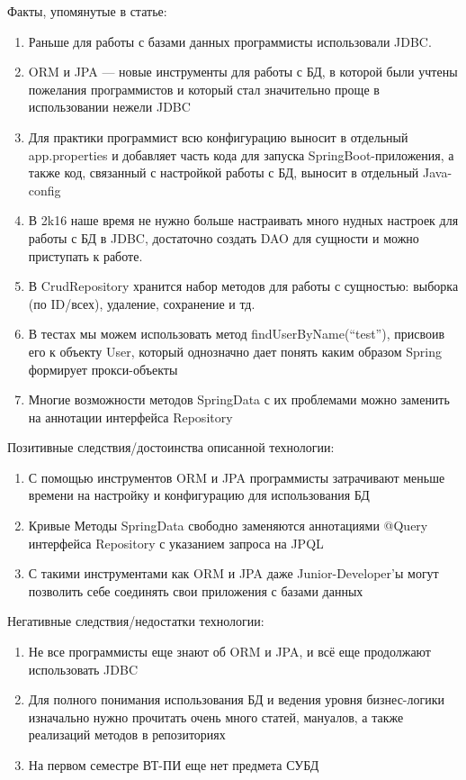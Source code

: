 \documentclass[12pt]{article}
\begin{document}
	{
	\newline
	Факты, упомянутые в статье:
	{\normalsize
	\par
	
	\begin{enumerate}
	\setlength\itemsep{0em}
	\item  Раньше для работы с базами данных программисты использовали JDBC. 
	\item  ORM и JPA — новые инструменты для работы с БД, в которой были учтены пожелания программистов и который стал значительно проще в использовании нежели JDBC
	\item Для практики программист всю конфигурацию выносит в отдельный app.properties и добавляет часть кода для запуска SpringBoot-приложения, а также код, связанный с настройкой работы с БД, выносит в отдельный Java-config 
	\item В 2k16 наше время не нужно больше настраивать много нудных настроек для работы с БД в JDBC, достаточно создать DAO для сущности и можно приступать к работе. 
	\item В CrudRepository хранится набор методов для работы с сущностью: выборка (по ID/всех), удаление, сохранение и тд.
	\item В тестах мы можем использовать метод findUserByName(“test”), присвоив его к объекту User, который однозначно дает понять каким образом Spring формирует прокси-объекты 
	\item Многие возможности методов SpringData с их проблемами можно заменить на аннотации интерфейса Repository 
	\end{enumerate}}
	\hrulefill
	\vspace{0.15in}
	\newline
	Позитивные следствия/достоинства описанной технологии:
	{\normalsize
	\par
	\begin{enumerate}
	\setlength\itemsep{0em}
	\item С помощью инструментов ORM и JPA программисты затрачивают меньше времени на настройку и конфигурацию для использования БД 
	\item Кривые Методы SpringData свободно заменяются аннотациями @Query интерфейса Repository с указанием запроса на JPQL
	\item С такими инструментами как ORM и JPA даже Junior-Developer’ы могут позволить себе соединять свои приложения с базами данных 
	\end{enumerate}
	\hrulefill
	}	
	\vspace{0.15in}
	\newline
	Негативные следствия/недостатки технологии:
	{\normalsize
	\par
	\begin{enumerate}
	\setlength\itemsep{0em}
	\item Не все программисты еще знают об ORM и JPA, и всё еще продолжают использовать JDBC
	\item Для полного понимания использования БД и ведения уровня бизнес-логики изначально нужно прочитать очень много статей, мануалов, а также реализаций методов в репозиториях 
	\item На первом семестре ВТ-ПИ еще нет предмета СУБД 
	\end{enumerate}
	}
	}
\end{document}
